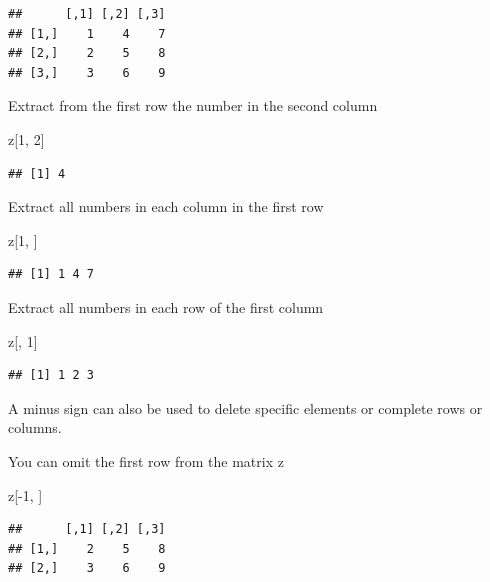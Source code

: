 \documentclass[
]{book}
\newenvironment{Shaded}{\begin{snugshade}}{\end{snugshade}}
\newcommand{\DecValTok}[1]{\textcolor[rgb]{0.00,0.00,0.81}{#1}}
\newcommand{\NormalTok}[1]{#1}
\newcommand{\SpecialCharTok}[1]{\textcolor[rgb]{0.00,0.00,0.00}{#1}}
\begin{document}
\begin{verbatim}
##      [,1] [,2] [,3]
## [1,]    1    4    7
## [2,]    2    5    8
## [3,]    3    6    9
\end{verbatim}

Extract from the first row the number in the second column

\begin{Shaded}
\begin{Highlighting}[]
\NormalTok{z[}\DecValTok{1}\NormalTok{, }\DecValTok{2}\NormalTok{]}
\end{Highlighting}
\end{Shaded}

\begin{verbatim}
## [1] 4
\end{verbatim}

Extract all numbers in each column in the first row

\begin{Shaded}
\begin{Highlighting}[]
\NormalTok{z[}\DecValTok{1}\NormalTok{, ]}
\end{Highlighting}
\end{Shaded}

\begin{verbatim}
## [1] 1 4 7
\end{verbatim}

Extract all numbers in each row of the first column

\begin{Shaded}
\begin{Highlighting}[]
\NormalTok{z[, }\DecValTok{1}\NormalTok{]}
\end{Highlighting}
\end{Shaded}

\begin{verbatim}
## [1] 1 2 3
\end{verbatim}

A minus sign can also be used to delete specific elements or complete rows or columns.

You can omit the first row from the matrix z

\begin{Shaded}
\begin{Highlighting}[]
\NormalTok{z[}\SpecialCharTok{{-}}\DecValTok{1}\NormalTok{, ]}
\end{Highlighting}
\end{Shaded}

\begin{verbatim}
##      [,1] [,2] [,3]
## [1,]    2    5    8
## [2,]    3    6    9
\end{verbatim}
\end{document}
